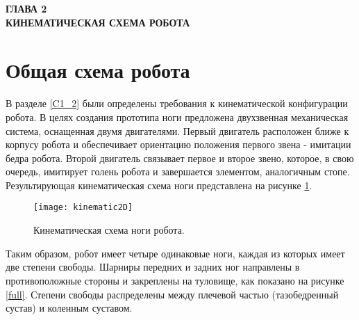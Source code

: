 \newpage
\begin{center}
	\textbf{\large ГЛАВА 2 \\ КИНЕМАТИЧЕСКАЯ СХЕМА РОБОТА}
\end{center}


\section{Общая схема робота}\label{C2_1}

В разделе \ref{C1_2} были определены требования к кинематической конфигурации робота. В целях создания прототипа ноги предложена двухзвенная механическая система, оснащенная двумя двигателями. Первый двигатель расположен ближе к корпусу робота и обеспечивает ориентацию положения первого звена - имитации бедра робота. Второй двигатель связывает первое и второе звено, которое, в свою очередь, имитирует голень робота и завершается элементом, аналогичным стопе. Результирующая кинематическая схема ноги представлена на рисунке \ref{kinematic2D}.

\begin{figure}[ht]
	\begin{center}
		\texttt{[image: kinematic2D]}
		\caption{Кинематическая схема ноги робота.}
		\label{kinematic2D}
	\end{center}
\end{figure}

Таким образом, робот имеет четыре одинаковые ноги, каждая из которых имеет две степени свободы. Шарниры передних и задних ног направлены в противоположные стороны и закреплены на туловище, как показано на рисунке \ref{full}. Степени свободы распределены между плечевой частью (тазобедренный сустав) и коленным суставом.

